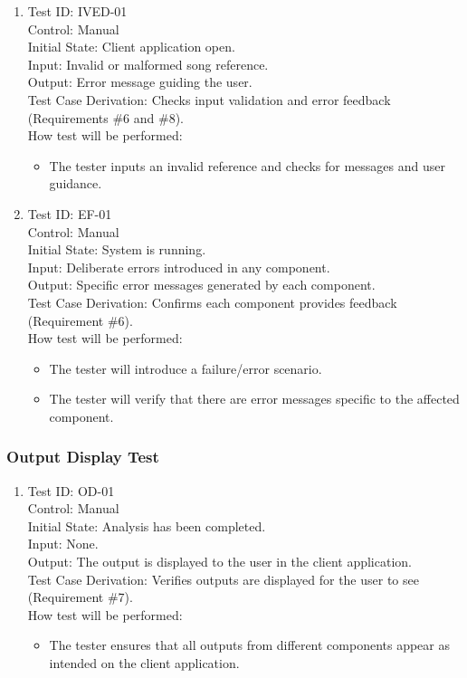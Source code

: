 \documentclass[12pt, titlepage]{article}
\begin{document}
\begin{enumerate}

\item Test ID: IVED-01\\
Control: Manual\\
Initial State: Client application open.\\
Input: Invalid or malformed song reference.\\
Output: Error message guiding the user.\\
Test Case Derivation: Checks input validation and error feedback (Requirements \#6 and \#8).\\
How test will be performed:
\begin{itemize}
    \item The tester inputs an invalid reference and checks for messages and user guidance.
\end{itemize}

\item Test ID: EF-01\\
Control: Manual\\
Initial State: System is running.\\
Input: Deliberate errors introduced in any component.\\
Output: Specific error messages generated by each component.\\
Test Case Derivation: Confirms each component provides feedback (Requirement \#6).\\
How test will be performed:
\begin{itemize}
    \item The tester will introduce a failure/error scenario.
    \item The tester will verify that there are error messages specific to the affected component.
\end{itemize}

\end{enumerate}

\subsubsection{Output Display Test}

\begin{enumerate}

\item Test ID: OD-01\\
Control: Manual\\
Initial State: Analysis has been completed.\\
Input: None.\\
Output: The output is displayed to the user in the client application.\\
Test Case Derivation: Verifies outputs are displayed for the user to see (Requirement \#7).\\
How test will be performed:
\begin{itemize}
    \item The tester ensures that all outputs from different components appear as intended on the client application.
\end{itemize}

\end{enumerate}
\end{document}
